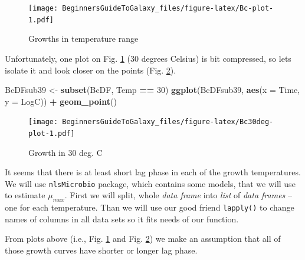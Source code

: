 \documentclass[]{book}
\newenvironment{Shaded}{\begin{snugshade}}{\end{snugshade}}
\newcommand{\KeywordTok}[1]{\textcolor[rgb]{0.13,0.29,0.53}{\textbf{#1}}}
\newcommand{\DataTypeTok}[1]{\textcolor[rgb]{0.13,0.29,0.53}{#1}}
\newcommand{\DecValTok}[1]{\textcolor[rgb]{0.00,0.00,0.81}{#1}}
\newcommand{\StringTok}[1]{\textcolor[rgb]{0.31,0.60,0.02}{#1}}
\newcommand{\OperatorTok}[1]{\textcolor[rgb]{0.81,0.36,0.00}{\textbf{#1}}}
\newcommand{\NormalTok}[1]{#1}
\theoremstyle{definition}
\theoremstyle{definition}
\theoremstyle{definition}
\theoremstyle{remark}
\begin{document}
\begin{figure}
\centering
\texttt{[image: BeginnersGuideToGalaxy\_files/figure-latex/Bc-plot-1.pdf]}
\caption{\label{fig:Bc-plot}Growths in temperature range}
\end{figure}

Unfortunately, one plot on Fig. \ref{fig:Bc-plot} (30 degrees Celsius)
is bit compressed, so lets isolate it and look closer on the points
(Fig. \ref{fig:Bc30deg-plot}).

\begin{Shaded}
\begin{Highlighting}[]
\NormalTok{BcDFsub39 <-}\StringTok{ }\KeywordTok{subset}\NormalTok{(BcDF, Temp }\OperatorTok{==}\StringTok{ }\DecValTok{30}\NormalTok{)}
\KeywordTok{ggplot}\NormalTok{(BcDFsub39, }\KeywordTok{aes}\NormalTok{(}\DataTypeTok{x =}\NormalTok{ Time, }\DataTypeTok{y =}\NormalTok{ LogC)) }\OperatorTok{+}
\StringTok{  }\KeywordTok{geom_point}\NormalTok{()}
\end{Highlighting}
\end{Shaded}

\begin{figure}
\centering
\texttt{[image: BeginnersGuideToGalaxy\_files/figure-latex/Bc30deg-plot-1.pdf]}
\caption{\label{fig:Bc30deg-plot}Growth in 30 deg. C}
\end{figure}

It seems that there is at least short lag phase in each of the growth
temperatures. We will use \texttt{nlsMicrobio} package, which contains
some models, that we will use to estimate \(\mu_{max}\). First we will
split, whole \emph{data frame} into \emph{list} of \emph{data frames} --
one for each temperature. Than we will use our good friend
\texttt{lapply()} to change names of columns in all data sets so it fits
needs of our function.

\begin{Shaded}
\end{Shaded}

From plots above (i.e., Fig. \ref{fig:Bc-plot} and Fig.
\ref{fig:Bc30deg-plot}) we make an assumption that all of those growth
curves have shorter or longer lag phase.
\end{document}
